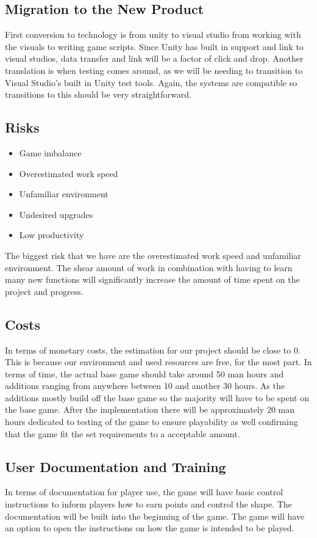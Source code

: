 \documentclass[12pt, titlepage]{article}
\begin{document}
\subsection{Migration to the New Product}
First conversion to technology is from unity to visual studio from working with the visuals to writing game scripts. Since Unity has built in support and link to visual studios, data transfer and link will be a factor of click and drop. Another translation is when testing comes around, as we will be needing to transition to Visual Studio's built in Unity test tools.  Again, the systems are compatible so transitions to this should be very straightforward.


\subsection{Risks}
\begin{itemize}
\item Game imbalance
\item Overestimated work speed
\item Unfamiliar environment
\item Undesired upgrades
\item Low productivity
\end{itemize}

\indent The biggest risk that we have are the overestimated work speed and unfamiliar environment. The shear amount of work in combination with having to learn many new functions will significantly increase the amount of time spent on the project and progress. 


\subsection{Costs}
In terms of monetary costs, the estimation for our project should be close to 0. This is because our environment and used resources are free, for the most part. In terms of time, the actual base game should take around 50 man hours and additions ranging from anywhere between 10 and another 30 hours. As the additions mostly build off the base game so the majority will have to be spent on the base game. {\color{blue}After the implementation there will be approximately 20 man hours dedicated to testing of the game to ensure playability as well confirming that the game fit the set requirements to a acceptable amount.}

\subsection{User Documentation and Training}
In terms of documentation for player use, the game will have basic control instructions to inform players how to earn points and control the shape. The documentation will be built into the beginning of the game. {\color{blue}The game will have an option to open the instructions on how the game is intended to be played.
}\\
\end{document}
